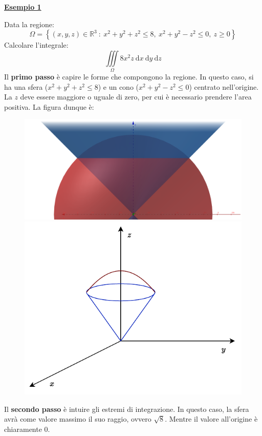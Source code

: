 \documentclass[a4paper]{article}
\newcommand{\example}[1]{\textcolor{Green4}{\textbf{#1}}}
\begin{document}
	\begin{flushleft}
		\example{\underline{Esempio 1}}
	\end{flushleft}
	Data la regione:
	\begin{equation*}
		\Omega = \left\{\left(x,y,z\right) \in \mathbb{R}^{3} \: : \: x^{2} + y^{2} + z^{2} \le 8, \: x^{2} + y^{2} - z^{2} \le 0, \: z \ge 0\right\}
	\end{equation*}
	Calcolare l'integrale:
	\begin{equation*}
		\displaystyle\iiint\limits_{\Omega} 8x^{2}z \:\mathrm{d}x\:\mathrm{d}y\:\mathrm{d}z
	\end{equation*}
	Il \textbf{primo passo} è capire le forme che compongono la regione. In questo caso, si ha una sfera ($x^{2} + y^{2} + z^{2} \le 8$) e un cono ($x^{2} + y^{2} - z^{2} \le 0$) centrato nell'origine. La $z$ deve essere maggiore o uguale di zero, per cui è necessario prendere l'area positiva. La figura dunque è:
	\begin{figure}[!htp]
		\centering
		\includegraphics[width=\textwidth]{img/integrazione_per_strati_3.png}
		\includegraphics[width=.7\textwidth]{img/integrazione_per_strati.pdf}
	\end{figure}

	\noindent
	Il \textbf{secondo passo} è intuire gli estremi di integrazione. In questo caso, la sfera avrà come valore massimo il suo raggio, ovvero $\sqrt{8}$. Mentre il valore all'origine è chiaramente $0$.
\end{document}
